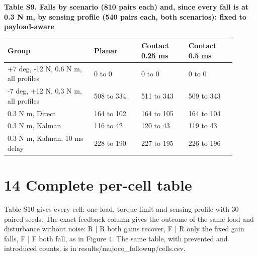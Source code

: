 \documentclass[11pt,a4paper]{article}
\begin{document}
\textbf{Table S9. Falls by scenario (810 pairs each) and, since every fall is at 0.3 N m, by sensing profile (540 pairs each, both scenarios): fixed to payload-aware}
\begin{longtable}{p{0.333\linewidth}p{0.189\linewidth}p{0.189\linewidth}p{0.189\linewidth}}
\toprule
Group & Planar & Contact 0.25 ms & Contact 0.5 ms \\ \midrule \endhead
+7 deg, -12 N, 0.6 N m, all profiles & 0 to 0 & 0 to 0 & 0 to 0 \\
-7 deg, +12 N, 0.3 N m, all profiles & 508 to 334 & 511 to 343 & 509 to 343 \\
0.3 N m, Direct & 164 to 102 & 164 to 105 & 164 to 104 \\
0.3 N m, Kalman & 116 to 42 & 120 to 43 & 119 to 43 \\
0.3 N m, Kalman, 10 ms delay & 228 to 190 & 227 to 195 & 226 to 196 \\
\bottomrule
\end{longtable}
\clearpage
\section*{14 Complete per-cell table}
Table S10 gives every cell: one load, torque limit and sensing profile with 30 paired seeds. The exact-feedback column gives the outcome of the same load and disturbance without noise: R | R both gains recover, F | R only the fixed gain falls, F | F both fall, as in Figure 4. The same table, with prevented and introduced counts, is in results/mujoco\_followup/cells.csv.
\end{document}
